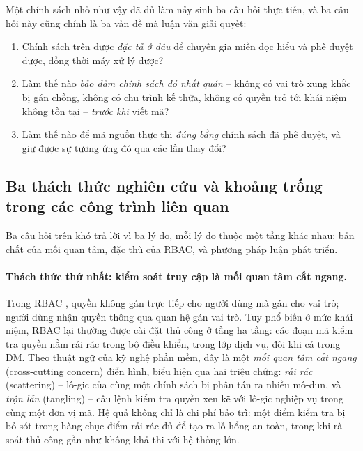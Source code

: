 Một chính sách nhỏ như vậy đã đủ làm nảy sinh ba câu hỏi thực tiễn, và ba câu hỏi này cũng chính là ba vấn đề mà luận văn giải quyết:

\begin{enumerate}[leftmargin=1.8em,itemsep=3pt]
  \item Chính sách trên được \emph{đặc tả ở đâu} để chuyên gia miền đọc hiểu và phê duyệt được, đồng thời máy xử lý được?
  \item Làm thế nào \emph{bảo đảm chính sách đó nhất quán} -- không có vai trò xung khắc bị gán chồng, không có chu trình kế thừa, không có quyền trỏ tới khái niệm không tồn tại -- \emph{trước khi} viết mã?
  \item Làm thế nào để mã nguồn thực thi \emph{đúng bằng} chính sách đã phê duyệt, và giữ được sự tương ứng đó qua các lần thay đổi?
\end{enumerate}

\subsection{Ba thách thức nghiên cứu và khoảng trống trong các công trình liên quan}
\label{subsec:thach-thuc}

Ba câu hỏi trên khó trả lời vì ba lý do, mỗi lý do thuộc một tầng khác nhau: bản chất của mối quan tâm, đặc thù của RBAC, và phương pháp luận phát triển.

\paragraph{Thách thức thứ nhất: kiểm soát truy cập là mối quan tâm cắt ngang.}
Trong RBAC \cite{sandhu1996}, quyền không gán trực tiếp cho người dùng mà gán cho vai trò; người dùng nhận quyền thông qua quan hệ gán vai trò. Tuy phổ biến ở mức khái niệm, RBAC lại thường được cài đặt thủ công ở tầng hạ tầng: các đoạn mã kiểm tra quyền nằm rải rác trong bộ điều khiển, trong lớp dịch vụ, đôi khi cả trong DM. Theo thuật ngữ của kỹ nghệ phần mềm, đây là một \emph{mối quan tâm cắt ngang} (cross-cutting concern) điển hình, biểu hiện qua hai triệu chứng: \emph{rải rác} (scattering) -- lô-gic của cùng một chính sách bị phân tán ra nhiều mô-đun, và \emph{trộn lẫn} (tangling) -- câu lệnh kiểm tra quyền xen kẽ với lô-gic nghiệp vụ trong cùng một đơn vị mã. Hệ quả không chỉ là chi phí bảo trì: một điểm kiểm tra bị bỏ sót trong hàng chục điểm rải rác đủ để tạo ra lỗ hổng an toàn, trong khi rà soát thủ công gần như không khả thi với hệ thống lớn.

